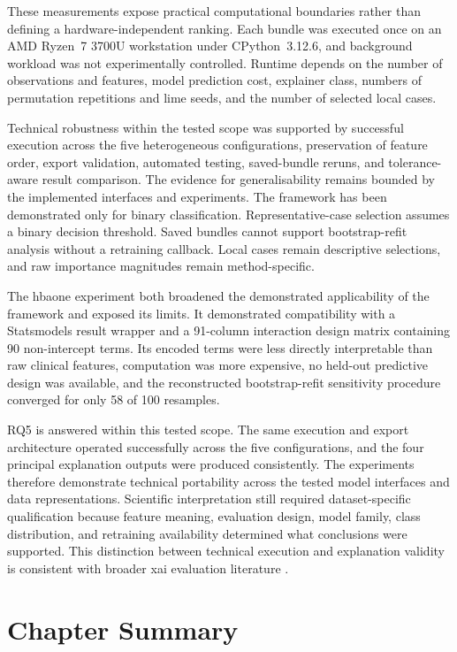 These measurements expose practical computational boundaries rather than defining a hardware-independent ranking. Each bundle was executed once on an AMD Ryzen~7 3700U workstation under CPython~3.12.6, and background workload was not experimentally controlled. Runtime depends on the number of observations and features, model prediction cost, explainer class, numbers of permutation repetitions and \gls{lime} seeds, and the number of selected local cases.

Technical robustness within the tested scope was supported by successful execution across the five heterogeneous configurations, preservation of feature order, export validation, automated testing, saved-bundle reruns, and tolerance-aware result comparison. The evidence for generalisability remains bounded by the implemented interfaces and experiments. The framework has been demonstrated only for binary classification. Representative-case selection assumes a binary decision threshold. Saved bundles cannot support bootstrap-refit analysis without a retraining callback. Local cases remain descriptive selections, and raw importance magnitudes remain method-specific.

The \gls{hbaone} experiment both broadened the demonstrated applicability of the framework and exposed its limits. It demonstrated compatibility with a Statsmodels result wrapper and a 91-column interaction design matrix containing 90 non-intercept terms. Its encoded terms were less directly interpretable than raw clinical features, computation was more expensive, no held-out predictive design was available, and the reconstructed bootstrap-refit sensitivity procedure converged for only 58 of 100 resamples.

RQ5 is answered within this tested scope. The same execution and export architecture operated successfully across the five configurations, and the four principal explanation outputs were produced consistently. The experiments therefore demonstrate technical portability across the tested model interfaces and data representations. Scientific interpretation still required dataset-specific qualification because feature meaning, evaluation design, model family, class distribution, and retraining availability determined what conclusions were supported. This distinction between technical execution and explanation validity is consistent with broader \gls{xai} evaluation literature \citep{mohseni_multidisciplinary_2021, vilone_classification_2021}.

\section{Chapter Summary}

